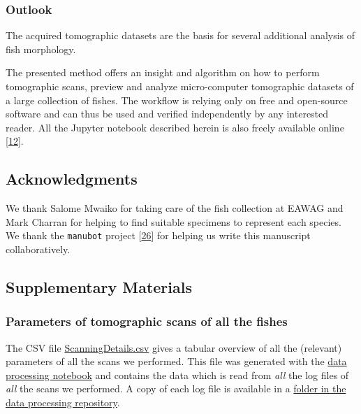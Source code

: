 \hypertarget{outlook}{%
\subsubsection{Outlook}\label{outlook}}

The acquired tomographic datasets are the basis for several additional analysis of fish morphology.

The presented method offers an insight and algorithm on how to perform tomographic scans, preview and analyze micro-computer tomographic datasets of a large collection of fishes.
The workflow is relying only on free and open-source software and can thus be used and verified independently by any interested reader.
All the Jupyter notebook described herein is also freely available online {[}\protect\hyperlink{ref-1HteOscVd}{12}{]}.

\hypertarget{acknowledgments}{%
\subsection{Acknowledgments}\label{acknowledgments}}

We thank Salome Mwaiko for taking care of the fish collection at EAWAG and Mark Charran for helping to find suitable specimens to represent each species.
We thank the \texttt{manubot} project {[}\protect\hyperlink{ref-YuJbg3zO}{26}{]} for helping us write this manuscript collaboratively.

\hypertarget{supplementary-materials}{%
\subsection{Supplementary Materials}\label{supplementary-materials}}

\hypertarget{parameters-of-tomographic-scans-of-all-the-fishes}{%
\subsubsection{Parameters of tomographic scans of all the fishes}\label{parameters-of-tomographic-scans-of-all-the-fishes}}

The CSV file \href{https://github.com/habi/EAWAG-manuscript/blob/main/content/data/ScanningDetails.csv}{ScanningDetails.csv} gives a tabular overview of all the (relevant) parameters of all the scans we performed.
This file was generated with the \href{https://github.com/habi/EAWAG/blob/master/DataWrangling.ipynb}{data processing notebook} and contains the data which is read from \emph{all} the log files of \emph{all} the scans we performed.
A copy of each log file is available in a \href{https://github.com/habi/EAWAG/tree/master/logfiles}{folder in the data processing repository}.

